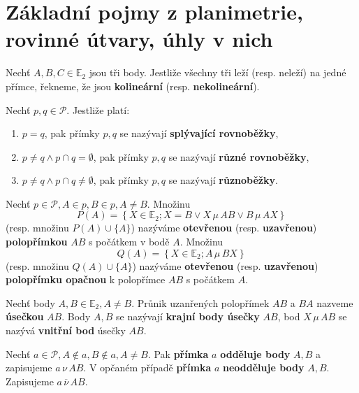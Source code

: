 \section{Základní pojmy z planimetrie, rovinné útvary, úhly v nich}
\begin{definition}
  Nechť $A,B,C\in \mathbb E_2$ jsou tři body. Jestliže všechny tři leží (resp. neleží) na jedné přímce, řekneme, že jsou \textbf{kolineární} (resp. \textbf{nekolineární}).
\end{definition}

\begin{definition}
  Nechť $p,q\in \mathscr P$. Jestliže platí:
  \begin{enumerate}[$i.$]
    \item $p=q$, pak přímky $p,q$ se nazývají \textbf{splývající rovnoběžky},
    \item $p \ne q \land p\cap q = \emptyset$, pak přímky $p,q$ se nazývají \textbf{různé rovnoběžky},
    \item $p \ne q \land p\cap q \ne \emptyset$, pak přímky $p,q$ se nazývají \textbf{různoběžky}.
  \end{enumerate}
\end{definition}

\begin{definition}
  Nechť $p\in \mathscr P,A \in p, B \in p, A \ne B.$ Množinu
  \[
    P(A)=\left \{ X\in \mathbb E_2; X=B \lor X\,\mu\, AB \lor B\, \mu\, AX \right \}
  \]
  (resp. množinu $P(A)\cup \{A\}$) nazýváme \textbf{otevřenou} (resp. \textbf{uzavřenou}) \textbf{polopřímkou} $AB$ s počátkem v bodě $A$. Množinu
  \[
    Q(A)=\left \{ X\in \mathbb E_2; A\,\mu\, BX \right \}
  \]
  (resp. množinu $Q(A)\cup \{A\}$) nazýváme \textbf{otevřenou} (resp. \textbf{uzavřenou}) \textbf{polopřímku opačnou} k polopřímce $AB$ s počátkem $A$.
\end{definition}

\begin{definition}
  Nechť body $A,B\in \mathbb E_2, A\ne B$. Průnik uzanřených polopřímek $AB$ a $BA$ nazveme \textbf{úsečkou} $AB$. Body $A,B$ se nazývají \textbf{krajní body úsečky} $AB$, bod $X\,\mu \, AB$ se nazývá \textbf{vnitřní bod} úsečky $AB$.
\end{definition}

\begin{definition}
Nechť $a\in \mathscr P, A\notin a, B\notin a, A\ne B.$ Pak \textbf{přímka} $a$ \textbf{odděluje body} $A,B$ a zapisujeme $a\, \nu\, AB.$ V opčaném případě \textbf{přímka} $a$ \textbf{neodděluje body} $A,B$. Zapisujeme $a\, \overline \nu \,AB.$
\end{definition}

